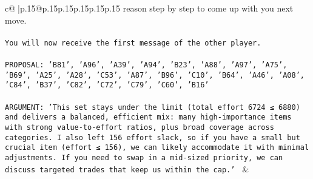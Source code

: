 \documentclass{article}
\begin{document}
{\begin{supertabular}{c@{$\;$}|p{.15\linewidth}@{}p{.15\linewidth}p{.15\linewidth}p{.15\linewidth}p{.15\linewidth}p{.15\linewidth}}
{{{reason step by step to come up with you next move.\\ \tt \\ \tt You will now receive the first message of the other player.\\ \tt \\ \tt PROPOSAL: {'B81', 'A96', 'A39', 'A94', 'B23', 'A88', 'A97', 'A75', 'B69', 'A25', 'A28', 'C53', 'A87', 'B96', 'C10', 'B64', 'A46', 'A08', 'C84', 'B37', 'C82', 'C72', 'C79', 'C60', 'B16'}\\ \tt \\ \tt ARGUMENT: {'This set stays under the limit (total effort 6724 ≤ 6880) and delivers a balanced, efficient mix: many high-importance items with strong value-to-effort ratios, plus broad coverage across categories. I also left 156 effort slack, so if you have a small but crucial item (effort ≤ 156), we can likely accommodate it with minimal adjustments. If you need to swap in a mid-sized priority, we can discuss targeted trades that keep us within the cap.'} 
	  } 
	   } 
	   } 
	 & \\ 
 

    \theutterance {}  


\end{supertabular}}
\end{document}
